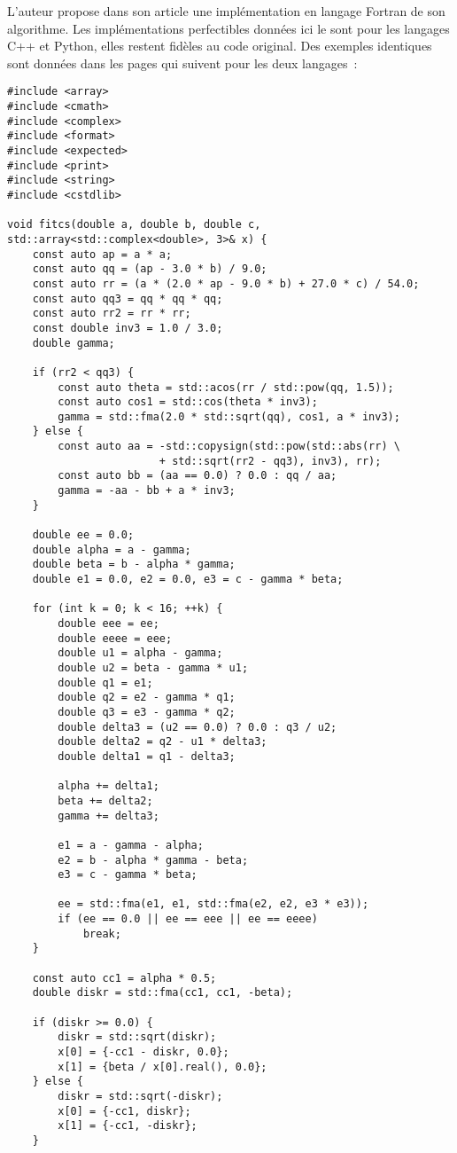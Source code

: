 \documentclass[11pt]{amsart}
\begin{document}
L'auteur propose dans son article une impl\'ementation en langage Fortran de son algorithme. Les impl\'ementations perfectibles donn\'ees ici le sont pour
les langages C++ et Python, elles restent fid\`eles au code original. Des exemples identiques sont donn\'ees dans les pages qui suivent pour les deux langages~:
\begin{lstlisting}
#include <array>
#include <cmath>
#include <complex>
#include <format>
#include <expected>
#include <print>
#include <string>
#include <cstdlib>

void fitcs(double a, double b, double c, std::array<std::complex<double>, 3>& x) {
    const auto ap = a * a;
    const auto qq = (ap - 3.0 * b) / 9.0;
    const auto rr = (a * (2.0 * ap - 9.0 * b) + 27.0 * c) / 54.0;
    const auto qq3 = qq * qq * qq;
    const auto rr2 = rr * rr;
    const double inv3 = 1.0 / 3.0;
    double gamma;

    if (rr2 < qq3) {
        const auto theta = std::acos(rr / std::pow(qq, 1.5));
        const auto cos1 = std::cos(theta * inv3);
        gamma = std::fma(2.0 * std::sqrt(qq), cos1, a * inv3);
    } else {
        const auto aa = -std::copysign(std::pow(std::abs(rr) \
                        + std::sqrt(rr2 - qq3), inv3), rr);
        const auto bb = (aa == 0.0) ? 0.0 : qq / aa;
        gamma = -aa - bb + a * inv3;
    }

    double ee = 0.0;
    double alpha = a - gamma;
    double beta = b - alpha * gamma;
    double e1 = 0.0, e2 = 0.0, e3 = c - gamma * beta;

    for (int k = 0; k < 16; ++k) {
        double eee = ee;
        double eeee = eee;
        double u1 = alpha - gamma;
        double u2 = beta - gamma * u1;
        double q1 = e1;
        double q2 = e2 - gamma * q1;
        double q3 = e3 - gamma * q2;
        double delta3 = (u2 == 0.0) ? 0.0 : q3 / u2;
        double delta2 = q2 - u1 * delta3;
        double delta1 = q1 - delta3;

        alpha += delta1;
        beta += delta2;
        gamma += delta3;

        e1 = a - gamma - alpha;
        e2 = b - alpha * gamma - beta;
        e3 = c - gamma * beta;

        ee = std::fma(e1, e1, std::fma(e2, e2, e3 * e3));
        if (ee == 0.0 || ee == eee || ee == eeee)
            break;
    }

    const auto cc1 = alpha * 0.5;
    double diskr = std::fma(cc1, cc1, -beta);

    if (diskr >= 0.0) {
        diskr = std::sqrt(diskr);
        x[0] = {-cc1 - diskr, 0.0};
        x[1] = {beta / x[0].real(), 0.0};
    } else {
        diskr = std::sqrt(-diskr);
        x[0] = {-cc1, diskr};
        x[1] = {-cc1, -diskr};
    }


\end{lstlisting}
\end{document}
